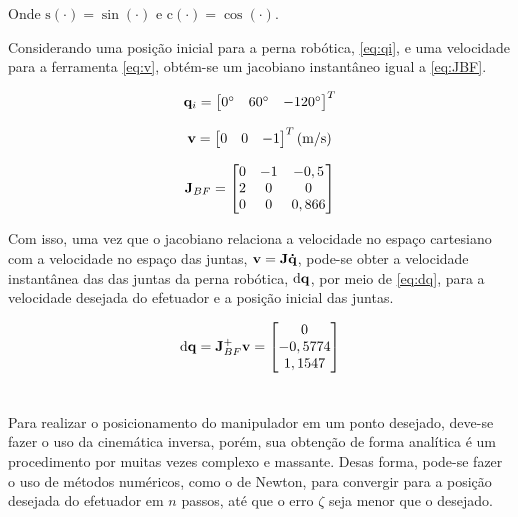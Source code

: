 Onde $\text{s}(\cdot) = \sin(\cdot)$ e $\text{c}(\cdot) = \cos(\cdot)$.

Considerando uma posição inicial para a perna robótica, \eqref{eq:qi}, e uma velocidade para a ferramenta \eqref{eq:v}, obtém-se um jacobiano instantâneo igual a \eqref{eq:JBF}.

\begin{equation}\label{eq:qi}
	\mathbf{q}_i = \begin{bmatrix}
		0^\circ & 60^\circ & -120^\circ
	\end{bmatrix}^T
\end{equation}

\begin{equation}\label{eq:v}
	\mathbf{v} = \begin{bmatrix}
		0 & 0 & -1\end{bmatrix}^T \text{(m/s)}
\end{equation}

\begin{equation}\label{eq:JBF}
	\mathbf{J}_{BF} = \begin{bmatrix}
		0 & -1 & -0,5 \\
		2 & 0 & 0 \\
		0 & 0 & 0,866
	\end{bmatrix}
\end{equation}

Com isso, uma vez que o jacobiano relaciona a velocidade no espaço cartesiano com a velocidade no espaço das juntas, $\mathbf{v} = \mathbf{J}\mathbf{\Dot{q}}$, pode-se obter a velocidade instantânea das das juntas da perna robótica, $\text{d}\mathbf{q}$, por meio de \eqref{eq:dq}, para a velocidade desejada do efetuador e a posição inicial das juntas.

\begin{equation}\label{eq:dq}
	\text{d}\mathbf{q} = \mathbf{J}_{BF}^+ \mathbf{v} = \begin{bmatrix}0 \\ -0,5774 \\ 1,1547 	\end{bmatrix}
\end{equation}





\section{}

Para realizar o posicionamento do manipulador em um ponto desejado, deve-se fazer o uso da cinemática inversa, porém, sua obtenção de forma analítica é um procedimento por muitas vezes complexo e massante. Desas forma, pode-se fazer o uso de métodos numéricos, como o de Newton, para convergir para a posição desejada do efetuador em $n$ passos, até que o erro $\zeta$ seja menor que o desejado.

